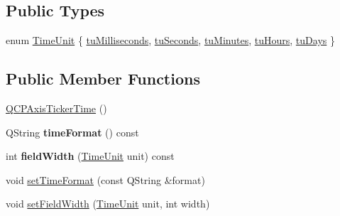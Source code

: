 \subsection*{Public Types}
\begin{DoxyCompactItemize}
\item 
enum \hyperlink{classQCPAxisTickerTime_a5c48ded8c6d3a1aca9b68219469fea3e}{Time\+Unit} \{ \newline
\hyperlink{classQCPAxisTickerTime_a5c48ded8c6d3a1aca9b68219469fea3ea809db637d2a7f601287c8790facc25cf}{tu\+Milliseconds}, 
\hyperlink{classQCPAxisTickerTime_a5c48ded8c6d3a1aca9b68219469fea3ea22b2c1842215272ae827eea2d1cc037d}{tu\+Seconds}, 
\hyperlink{classQCPAxisTickerTime_a5c48ded8c6d3a1aca9b68219469fea3ea682de6640daef46cffd8a080348d7d00}{tu\+Minutes}, 
\hyperlink{classQCPAxisTickerTime_a5c48ded8c6d3a1aca9b68219469fea3ea83a5713594424ba17f1f62f18f0e5935}{tu\+Hours}, 
\newline
\hyperlink{classQCPAxisTickerTime_a5c48ded8c6d3a1aca9b68219469fea3eaf9729e64545307a80a0e3527d6da6556}{tu\+Days}
 \}
\end{DoxyCompactItemize}
\subsection*{Public Member Functions}
\begin{DoxyCompactItemize}
\item 
\hyperlink{classQCPAxisTickerTime_a5145aac1d2117fdac411d9e8552cc41b}{Q\+C\+P\+Axis\+Ticker\+Time} ()
\item 
\mbox{\label{classQCPAxisTickerTime_a99ad61dc7434a7fed1850e96bf748834}} 
Q\+String {\bfseries time\+Format} () const
\item 
\mbox{\label{classQCPAxisTickerTime_a6b58a98e4d64c6764aa61a707e4a344d}} 
int {\bfseries field\+Width} (\hyperlink{classQCPAxisTickerTime_a5c48ded8c6d3a1aca9b68219469fea3e}{Time\+Unit} unit) const
\item 
void \hyperlink{classQCPAxisTickerTime_a2f30b6e5125bce4256be9ce3177088ea}{set\+Time\+Format} (const Q\+String \&format)
\item 
void \hyperlink{classQCPAxisTickerTime_adc13e54fc969be98a5c0e3fa0dbaa293}{set\+Field\+Width} (\hyperlink{classQCPAxisTickerTime_a5c48ded8c6d3a1aca9b68219469fea3e}{Time\+Unit} unit, int width)
\end{DoxyCompactItemize}
